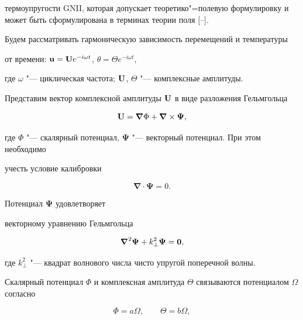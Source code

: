 термоупругости GNII, которая допускает теоретико"=полевую формулировку и может быть сформулирована в терминах теории поля [--].



Будем рассматривать гармоническую зависимость перемещений и температуры

от времени:  ${\bf u} = {\bf{U}}e^{ - i\omega t}$,  $\theta  = \Theta e^{ - i\omega t}$,

где $\omega$ "--- циклическая частота; ${\bf{U}}$, $\Theta$ "--- комплексные амплитуды.



Представим вектор комплексной амплитуды ${\bf{U}}$ в виде разложения Гельмгольца

\begin{equation}

\label{kov11:eq2}

{\bf{U}} = \boldsymbol\nabla \Phi  + \boldsymbol\nabla  \times {\boldsymbol\Psi},

\end{equation}

где $\Phi$ "--- скалярный потенциал, ${\boldsymbol\Psi}$ "--- векторный потенциал. При этом необходимо

учесть условие калибровки

\begin{equation}

\label{kov11:eq3}

\boldsymbol \nabla  \cdot {\boldsymbol{\Psi }} = 0.

\end{equation}

Потенциал ${\boldsymbol\Psi}$ удовлетворяет

векторному уравнению Гельмгольца

\begin{equation}

\label{kov11:eq4}

\boldsymbol\nabla ^2 {\boldsymbol{\Psi }} + k_ \bot ^2 {\boldsymbol{\Psi }} = {\bf{0}},

\end{equation}

где $k_\bot ^2 $ "--- квадрат волнового числа чисто упругой поперечной волны.



Скалярный потенциал  $\Phi$ и комплексная амплитуда $\Theta$ связываются потенциалом $\Omega$ согласно

\begin{equation}

\label{kov11:eq5}

\Phi  = a\Omega,\qquad \Theta  = b\Omega ,

\end{equation}

